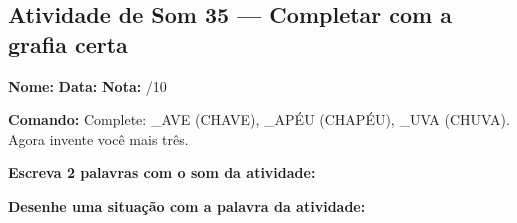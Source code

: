 \subsection{Atividade de Som 35 --- Completar com a grafia certa}
\begin{exercicio}



\noindent\textbf{Nome:} \underline{\hspace{3.2cm}} \quad \textbf{Data:} \underline{\hspace{1.6cm}} \quad \textbf{Nota:} \underline{\hspace{0.9cm}}/10


\noindent\textbf{Comando:} Complete: \_AVE (CHAVE), \_APÉU (CHAPÉU), \_UVA (CHUVA). Agora invente você mais três.


\begin{center}
\end{center}

\noindent\textbf{Escreva 2 palavras com o som da atividade:}

\begin{center}
  \underline{\hspace{3cm}} \quad \underline{\hspace{3cm}}
\end{center}

\noindent\textbf{Desenhe uma situação com a palavra da atividade:}

\begin{center}
\end{center}

\end{exercicio}



